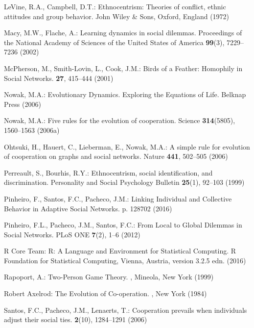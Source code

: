 \begin{thebibliography}{10}
	LeVine, R.A., Campbell, D.T.: Ethnocentrism: Theories of conflict, ethnic
	attitudes and group behavior.
	\newblock John Wiley \& Sons, Oxford, England (1972)
	
	Macy, M.W., Flache, A.: Learning dynamics in social dilemmas.
	\newblock Proceedings of the National Academy of Sciences of the United States
	of America \textbf{99}(3), 7229--7236 (2002)
	
	McPherson, M., Smith-Lovin, L., Cook, J.M.: {Birds of a Feather: Homophily in
		Social Networks}.
	 \textbf{27}, 415--444 (2001)
	
	Nowak, M.A.: {Evolutionary Dynamics. Exploring the Equations of Life}.
	\newblock Belknap Press (2006)
	
	Nowak, M.A.: {Five rules for the evolution of cooperation}.
	\newblock Science \textbf{314}(5805), 1560--1563 (2006a)
	
	Ohtsuki, H., Hauert, C., Lieberman, E., Nowak, M.A.: {A simple rule for
		evolution of cooperation on graphs and social networks}.
	\newblock Nature \textbf{441}, 502--505 (2006)
	
	Perreault, S., Bourhis, R.Y.: Ethnocentrism, social identification, and
	discrimination.
	\newblock Personality and Social Psychology Bulletin \textbf{25}(1), 92--103
	(1999)
	
	Pinheiro, F., Santos, F.C., Pacheco, J.M.: {Linking Individual and Collective
		Behavior in Adaptive Social Networks}.
	 p. 128702 (2016)
	
	Pinheiro, F.L., Pacheco, J.M., Santos, F.C.: {From Local to Global Dilemmas in
		Social Networks}.
	\newblock PLoS ONE \textbf{7}(2), 1--6 (2012)
	
	{R Core Team}: R: A Language and Environment for Statistical Computing.
	\newblock R Foundation for Statistical Computing, Vienna, Austria, version
	3.2.5 edn. (2016)
	
	Rapoport, A.: {Two-Person Game Theory}.
	, {Mineola, New York} (1999)
	
	{Robert Axelrod}: The Evolution of Co-operation.
	, New York (1984)
	
	Santos, F.C., Pacheco, J.M., Lenaerts, T.: Cooperation prevails when
	individuals adjust their social ties.
	 \textbf{2}(10), 1284--1291 (2006)
	

\end{thebibliography}
